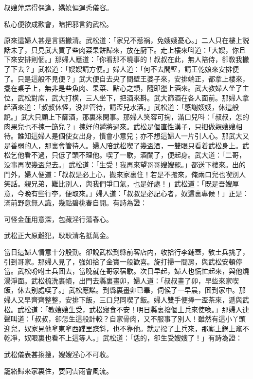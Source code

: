 \begin{myquote}
叔嫂萍踪得偶逢，嬌嬈偏逞秀儀容。

私心便欲成歡會，暗把邪言釣武松。
\end{myquote}

原來這婦人甚是言語撇清。武松道：「家兄不惹祸，免嫂嫂憂心。」二人只在樓上説話未了，只見武大買了些肉菜果餅歸來，放在廚下。走上樓來呌道：「大嫂，你且下來安排則個。」那婦人應道：「你看那不曉事的！叔叔在此，無人陪侍，卻敎我撇了下去？」武松道：「嫂嫂請方便。」婦人道：「何不去間壁，請王乾娘來安排便了。只是這般不見便？」武大便自去央了間壁王婆子來，安排端正，都拿上樓來，擺在桌子上，無非是些魚肉、果菜、點心之類，隨即盪上酒來。武大教婦人坐了主位，武松對席，武大打横，三人坐下，把酒來斟。武大篩酒在各人面前。那婦人拿起酒來道：「叔叔休怪，没甚管待，請盃兒水酒。」武松道：「感謝嫂嫂，休這般說。」武大只顧上下篩酒，那裏來閑事。那婦人笑容可掬，滿口兒呌：「叔叔，怎的肉果兒也不揀一筯兒？」揀好的遞將過來。武松是個直性漢子，只把做親嫂嫂相待。誰知這婦人是個使女出身，慣會小意兒；亦不想這婦人一片引人心。那武大又是善弱的人，那裏會管待人。婦人陪武松喫了幾盃酒，一雙眼只看着武松身上。武松乞他看不過，只低了頭不理他。喫了一歇，酒闌了，便起身。武大道：「二哥，没事再喫幾盃兒去。」武松道：「生受！我再來望哥哥嫂嫂罷。」都送下樓來。出的門外，婦人便道：「叔叔是必上心，搬來家裏住！若是不搬來，俺兩口兒也喫别人笑話。親兄弟，難比别人，與我們爭口氣，也是好處！」武松道：「既是吾嫂厚意，今晚有些行李，便取來。」婦人道：「叔叔是必記心者，奴這裏專候！」正是：滿前野意無人識，幾點碧桃春自開。有詩為證：

\begin{myquote}
可怪金蓮用意深，包藏淫行蕩春心。

武松正大原難犯，耿耿清名抵萬金。
\end{myquote}

當日這婦人情意十分殷勤。卻說武松到縣前客店内，收拾行李鋪蓋，敎土兵挑了，引到哥家。那婦人見了，強如拾了金寶一般歡喜。旋打掃一間房，與武松安頓停當。武松吩咐土兵囬去，當晚就在哥家宿歇。次日早起，婦人也慌忙起來，與他燒湯淨面。武松梳洗裹幘，出門去縣裏畫卯，婦人道：「叔叔畫了卯，早些來家喫飯，休去别處喫了。」武松應諾。到縣裏畫卯已畢，伺候了一早晨，囬到家中。那婦人又早齊齊整整，安排下飯，三口兒同喫了飯。婦人雙手便捧一盃茶來，遞與武松。武松道：「教嫂嫂生受，武松寢食不安！明日縣裏撥個土兵來使喚。」那婦人連聲叫道：「叔叔，卻怎生這般計較？自家骨肉，又不服事了別人！雖然有這小丫頭迎兒，奴家見他拿東拿西蹀里蹀斜，也不靠他。就是撥了土兵來，那廝上鍋上竈不乾凈，奴眼裏也看不上這等人。」武松道：「恁的，卻生受嫂嫂了！」有詩為證：

\begin{myquote}
武松儀表甚搊搜，嫂嫂淫心不可收。

籠絡歸來家裏住，要同雲雨會風流。
\end{myquote}

